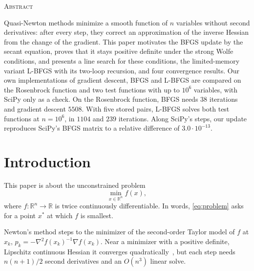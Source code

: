 \documentclass[11pt,a4paper]{amsart}
\numberwithin{equation}{section}
\theoremstyle{plain}
\theoremstyle{definition}
\theoremstyle{remark}
\newcommand{\R}{\mathbb{R}}
\newcommand{\grad}{\nabla}
\begin{document}
\begin{center}\scshape Abstract\end{center}
\noindent
Quasi-Newton methods minimize a smooth function of $n$ variables without
second derivatives: after every step, they correct an approximation of
the inverse Hessian from the change of the gradient. This paper
motivates the BFGS update by the secant equation, proves that it stays
positive definite under the strong Wolfe conditions, and presents a line
search for these conditions, the limited-memory variant L-BFGS with its
two-loop recursion, and four convergence results. Our own
implementations of gradient descent, BFGS and L-BFGS are compared on the
Rosenbrock function and two test functions with up to $10^6$ variables,
with SciPy only as a check. On the Rosenbrock function, BFGS
needs $38$ iterations and gradient descent $5508$. With five stored
pairs, L-BFGS solves both test functions at $n = 10^6$, in $1104$ and
$239$ iterations. Along SciPy's steps, our update reproduces SciPy's
BFGS matrix to a relative difference of $3.0 \cdot 10^{-13}$.

\bigskip
\setcounter{tocdepth}{1}
\tableofcontents

\section{Introduction}\label{sec:intro}

This paper is about the unconstrained problem
\begin{equation}\label{eq:problem}
  \min_{x \in \R^n} f(x),
\end{equation}
where $f : \R^n \to \R$ is twice continuously differentiable. In words,
\eqref{eq:problem} asks for a point $x^*$ at which $f$ is smallest.

Newton's method steps to the minimizer of the second-order Taylor model
of $f$ at $x_k$, $p_k = -\grad^2 f(x_k)^{-1} \grad f(x_k)$. Near a
minimizer with a positive definite, Lipschitz continuous Hessian it
converges quadratically~\cite[\S3.3]{nocedal2006}, but each step needs
$n(n+1)/2$ second derivatives and an $O(n^3)$ linear solve.
\end{document}
